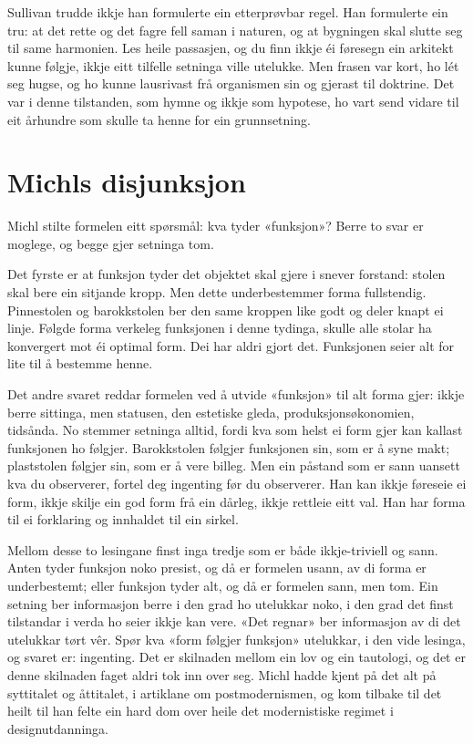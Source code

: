Sullivan trudde ikkje han formulerte ein etterprøvbar regel. Han formulerte ein tru: at det rette og det fagre fell saman i naturen, og at bygningen skal slutte seg til same harmonien. Les heile passasjen, og du finn ikkje éi føresegn ein arkitekt kunne følgje, ikkje eitt tilfelle setninga ville utelukke. Men frasen var kort, ho lét seg hugse, og ho kunne lausrivast frå organismen sin og gjerast til doktrine. Det var i denne tilstanden, som hymne og ikkje som hypotese, ho vart send vidare til eit århundre som skulle ta henne for ein grunnsetning.

\section{Michls disjunksjon}

Michl stilte formelen eitt spørsmål: kva tyder «funksjon»? Berre to svar er moglege, og begge gjer setninga tom\autocite{michl1995}.

Det fyrste er at funksjon tyder det objektet skal gjere i snever forstand: stolen skal bere ein sitjande kropp. Men dette underbestemmer forma fullstendig. Pinnestolen og barokkstolen ber den same kroppen like godt og deler knapt ei linje. Følgde forma verkeleg funksjonen i denne tydinga, skulle alle stolar ha konvergert mot éi optimal form. Dei har aldri gjort det. Funksjonen seier alt for lite til å bestemme henne.

Det andre svaret reddar formelen ved å utvide «funksjon» til alt forma gjer: ikkje berre sittinga, men statusen, den estetiske gleda, produksjonsøkonomien, tidsånda. No stemmer setninga alltid, fordi kva som helst ei form gjer kan kallast funksjonen ho følgjer. Barokkstolen følgjer funksjonen sin, som er å syne makt; plaststolen følgjer sin, som er å vere billeg. Men ein påstand som er sann uansett kva du observerer, fortel deg ingenting før du observerer. Han kan ikkje føreseie ei form, ikkje skilje ein god form frå ein dårleg, ikkje rettleie eitt val. Han har forma til ei forklaring og innhaldet til ein sirkel.

Mellom desse to lesingane finst inga tredje som er både ikkje-triviell og sann. Anten tyder funksjon noko presist, og då er formelen usann, av di forma er underbestemt; eller funksjon tyder alt, og då er formelen sann, men tom. Ein setning ber informasjon berre i den grad ho utelukkar noko, i den grad det finst tilstandar i verda ho seier ikkje kan vere. «Det regnar» ber informasjon av di det utelukkar tørt vêr. Spør kva «form følgjer funksjon» utelukkar, i den vide lesinga, og svaret er: ingenting. Det er skilnaden mellom ein lov og ein tautologi, og det er denne skilnaden faget aldri tok inn over seg. Michl hadde kjent på det alt på syttitalet og åttitalet, i artiklane om postmodernismen\autocite{michl1989}, og kom tilbake til det heilt til han felte ein hard dom over heile det modernistiske regimet i designutdanninga\autocite{michl2014}.

